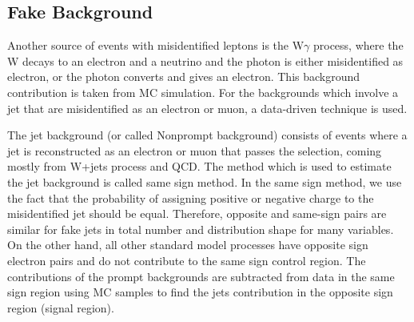 \subsection{Fake Background}
\label{tW_fake_background}

Another source of events with misidentified leptons is the W$\gamma$ process,
where the W decays to an electron and a neutrino and the photon is either misidentified as electron, or the photon converts and gives an electron. This background contribution is taken from MC simulation. For the backgrounds which involve a jet that are misidentified as an electron or muon, a data-driven technique is used.

The jet background (or called Nonprompt background) consists of events where a jet is reconstructed as an electron or muon that
passes the selection, coming mostly from W+jets process and QCD.
The method which is used to estimate the jet background is called same sign
method. In the same sign method, we use the fact that the probability of assigning positive or
negative charge to the misidentified jet should be equal. Therefore, opposite and same-sign  pairs are similar for fake jets in total number and distribution shape for many variables.
On the other hand, all other standard model processes have opposite sign electron pairs and
do not contribute to the same sign control region. The contributions of the prompt backgrounds
are subtracted from data in the same sign region using MC samples  to find the jets contribution in the opposite sign region (signal region).

